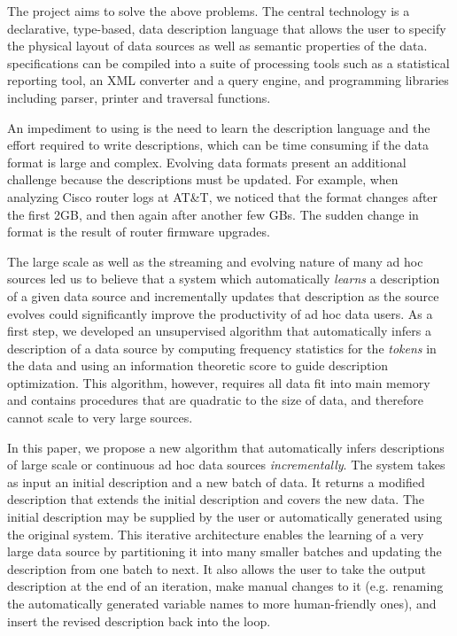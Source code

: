 The \pads{} project \cite{padsweb} aims to solve the above 
problems. The central technology is a declarative, type-based, 
data description language that allows the user to specify the physical
layout of data sources as well as semantic properties of the data. 
\pads{} specifications can be compiled into a suite of
processing tools such as a statistical reporting tool, an 
XML converter and a query engine, and programming libraries 
including parser, printer and traversal functions. 

An impediment to using \pads{} is the need to learn
the description language and the effort required to
write \pads{} descriptions, which can be time consuming
if the data format is large and complex. Evolving data formats 
present an additional challenge because the descriptions must be updated.
For example, when analyzing Cisco router
logs at AT\&T, we noticed that the format changes after the first 2GB, 
and then again after another few GBs. The sudden change in format is
the result of router firmware upgrades.

The large scale as well as the streaming and evolving nature of many ad hoc
sources led us to believe that a system which automatically {\em learns}
a \pads{} description of a given data source and incrementally updates that
description as the source evolves could significantly improve the productivity of ad hoc data users.
As a first step, we developed an unsupervised algorithm \learnpads{}
\cite{Fisher+:dirttoshovels,fisher+:sigmod08}
that automatically infers a \pads{} description of a data source by 
computing frequency statistics for the {\em tokens} in the data and using an information
theoretic score to guide description optimization. This algorithm, however,
requires all data fit into main memory and contains procedures 
that are quadratic to the size of data, 
and therefore cannot scale to very large sources. 

In this paper, we propose a new algorithm that automatically infers 
descriptions of large scale or continuous ad hoc data sources 
{\em incrementally}. The system takes as input an initial description 
and a new batch of data. It returns a
modified description that extends the initial description and covers the new 
data. The initial description may be supplied by the user or automatically
generated using the original \learnpads{} system. This iterative architecture
enables the learning of a very large data source by partitioning it 
into many smaller batches and updating the description from one batch to next. 
It also allows the user to take the output description at the end of
an iteration, make manual changes to it (e.g. renaming the 
automatically generated variable names to more human-friendly
ones), and insert the revised description back into the loop.

